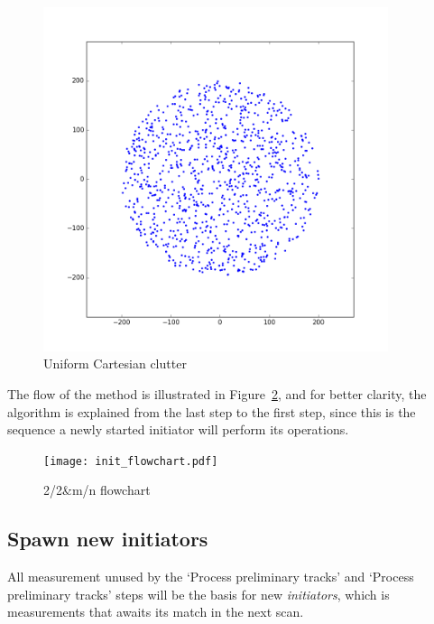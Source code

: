 \begin{figure}
\begin{minipage}{0.45\textwidth}
\includegraphics[width=0.9\textwidth]{Figures/clutterCartesian.png}
\caption{Uniform Cartesian clutter}\label{fig:clutter_cartesian}
\end{minipage}
\end{figure}
The flow of the method is illustrated in Figure~\ref{fig:init_flowchart}, and for better clarity, the algorithm is explained from the last step to the first step, since this is the sequence a newly started initiator will perform its operations.
\begin{figure}[H]
\centering
\texttt{[image: init\_flowchart.pdf]}
\caption{2/2\&m/n flowchart}\label{fig:init_flowchart}
\end{figure}


\subsection{Spawn new initiators}
All measurement unused by the `Process preliminary tracks' and `Process preliminary tracks' steps will be the basis for new \emph{initiators}, which is measurements that awaits its match in the next scan. 

